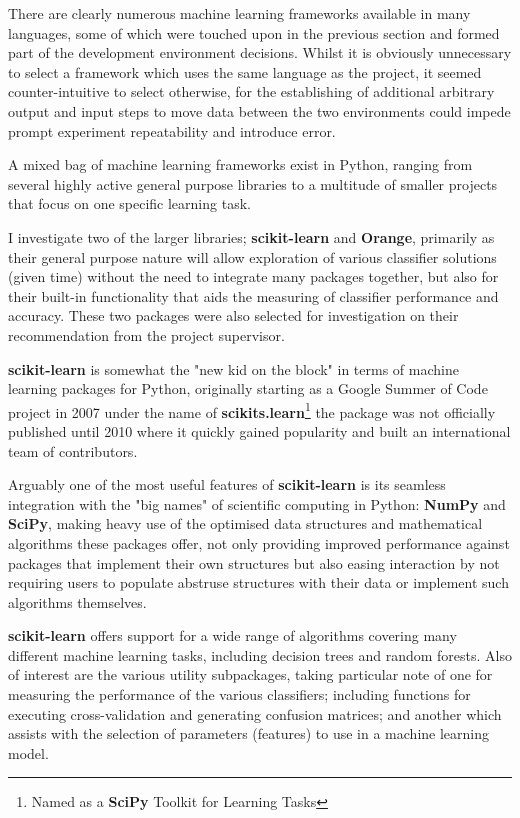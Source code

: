 There are clearly numerous machine learning frameworks available in many
languages, some of which were touched upon in the previous section and formed
part of the development environment decisions.
Whilst it is obviously unnecessary to select a framework which uses
the same language as the project, it seemed counter-intuitive to select otherwise,
for the establishing of additional arbitrary output and input steps to move data
between the two environments could impede prompt experiment repeatability and
introduce error.

A mixed bag of machine learning frameworks exist in Python\citep{py:for-ai},
ranging from several highly active general purpose libraries to a multitude of
smaller projects that focus on one specific learning task.

I investigate two of the larger libraries;
\textbf{scikit-learn}\citep{scikit-learn} and \textbf{Orange}\citep{orange},
primarily as their general purpose nature will allow exploration of various
classifier solutions (given time) without the need to integrate many packages
together, but also for their built-in functionality that aids the measuring of
classifier performance and accuracy. These two packages were also selected for
investigation on their recommendation from the project supervisor.


\textbf{scikit-learn} is somewhat the "new kid on the block" in terms of machine
learning packages for Python, originally starting as a Google Summer of Code
project in 2007 under the name of \textbf{scikits.learn}\footnote{Named as a
\textbf{SciPy} Toolkit for Learning Tasks} the package was not officially
published until 2010 where it quickly gained popularity and built an
international team of contributors\citep{about-scikit-learn}.

Arguably one of the most useful features of \textbf{scikit-learn} is its
seamless integration with the "big names" of scientific computing in Python:
\textbf{NumPy}\citep{NumPySciPy} and \textbf{SciPy}\citep{SciPy}, making heavy
use of the optimised data structures and mathematical algorithms these packages
offer, not only providing improved performance against packages that implement
their own structures but also easing interaction by not requiring users to
populate abstruse structures with their data or implement such algorithms
themselves.

\textbf{scikit-learn} offers support for a wide range of algorithms covering
many different machine learning tasks, including decision trees and random
forests. Also of interest are the various utility subpackages, taking particular
note of one for measuring the performance of the various classifiers;
including functions for executing cross-validation and generating confusion
matrices; and another which assists with the selection of parameters (features)
to use in a machine learning model.

